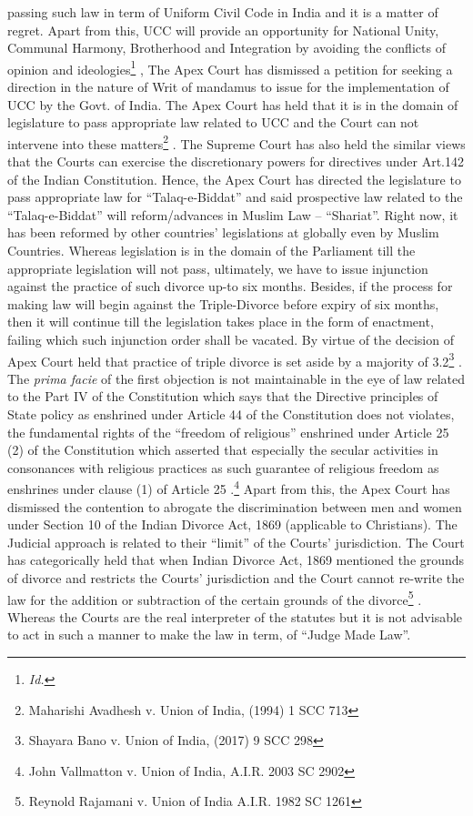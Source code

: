 \begin{multicols}{2}
passing such law in term of Uniform Civil Code in India and it is a matter of regret. Apart
from this, UCC will provide an opportunity for National Unity, Communal Harmony,
Brotherhood and Integration by avoiding the conflicts of opinion and ideologies\footnote{
\it Id.}
, The Apex
Court has dismissed a petition for seeking a direction in the nature of Writ of mandamus to
issue for the implementation of UCC by the Govt. of India. The Apex Court has held that it is
in the domain of legislature to pass appropriate law related to UCC and the Court can not
intervene into these matters\footnote{Maharishi Avadhesh v. Union of India, (1994) 1 SCC 713}
. The Supreme Court has also held the similar views that the
Courts can exercise the discretionary powers for directives under Art.142 of the Indian
Constitution. Hence, the Apex Court has directed the legislature to pass appropriate law for
“Talaq-e-Biddat” and said prospective law related to the “Talaq-e-Biddat” will
reform/advances in Muslim Law – “Shariat”. Right now, it has been reformed by other
countries’ legislations at globally even by Muslim Countries. Whereas legislation is in the
domain of the Parliament till the appropriate legislation will not pass, ultimately, we have to
issue injunction against the practice of such divorce up-to six months. Besides, if the process
for making law will begin against the Triple-Divorce before expiry of six months, then it will
continue till the legislation takes place in the form of enactment, failing which such
injunction order shall be vacated. By virtue of the decision of Apex Court held that practice
of triple divorce is set aside by a majority of 3.2\footnote{Shayara Bano v. Union of India, (2017) 9 SCC 298}
. 
The {\it prima facie} of the first objection is not maintainable in the eye of law related to the Part
IV of the Constitution which says that the Directive principles of State policy as enshrined
under Article 44 of the Constitution does not violates, the fundamental rights of the “freedom
of religious” enshrined under Article 25 (2) of the Constitution which asserted that especially
the secular activities in consonances with religious practices as such guarantee of religious
freedom as enshrines under clause (1) of Article 25
.\footnote{John Vallmatton v. Union of India, A.I.R. 2003 SC 2902} Apart from this, the Apex Court has
dismissed the contention to abrogate the discrimination between men and women under Section 10 of the Indian Divorce Act, 1869 (applicable to Christians). The Judicial approach
is related to their “limit” of the Courts’ jurisdiction. The Court has categorically held that
when Indian Divorce Act, 1869 mentioned the grounds of divorce and restricts the Courts’
jurisdiction and the Court cannot re-write the law for the addition or subtraction of the certain
grounds of the divorce\footnote{Reynold Rajamani v. Union of India A.I.R. 1982 SC 1261}
. Whereas the Courts are the real interpreter of the statutes but it is not
advisable to act in such a manner to make the law in term, of “Judge Made Law”.


\end{multicols}
